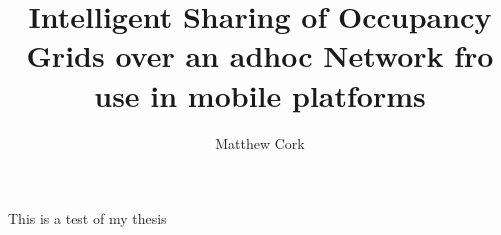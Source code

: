 \documentclass[12pt, oneside]{article}   	%
\title{Intelligent Sharing of Occupancy Grids over an adhoc Network fro use in mobile platforms}
\author{Matthew Cork}
\date{}							%
\begin{document}

This is a test of my thesis
\end{document}
